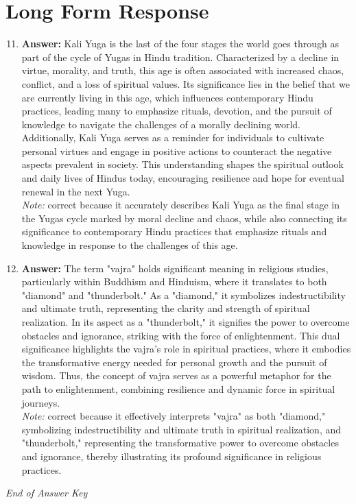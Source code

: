 \documentclass[12pt]{article}
\begin{document}
\section*{Long Form Response}
\begin{enumerate}[label=\arabic*.]
\setcounter{enumi}{10}
\item \textbf{Answer:} Kali Yuga is the last of the four stages the world goes through as part of the cycle of Yugas in Hindu tradition. Characterized by a decline in virtue, morality, and truth, this age is often associated with increased chaos, conflict, and a loss of spiritual values. Its significance lies in the belief that we are currently living in this age, which influences contemporary Hindu practices, leading many to emphasize rituals, devotion, and the pursuit of knowledge to navigate the challenges of a morally declining world. Additionally, Kali Yuga serves as a reminder for individuals to cultivate personal virtues and engage in positive actions to counteract the negative aspects prevalent in society. This understanding shapes the spiritual outlook and daily lives of Hindus today, encouraging resilience and hope for eventual renewal in the next Yuga.
\\ \textit{Note:} correct because it accurately describes Kali Yuga as the final stage in the Yugas cycle marked by moral decline and chaos, while also connecting its significance to contemporary Hindu practices that emphasize rituals and knowledge in response to the challenges of this age.
\item \textbf{Answer:} The term "vajra" holds significant meaning in religious studies, particularly within Buddhism and Hinduism, where it translates to both "diamond" and "thunderbolt." As a "diamond," it symbolizes indestructibility and ultimate truth, representing the clarity and strength of spiritual realization. In its aspect as a "thunderbolt," it signifies the power to overcome obstacles and ignorance, striking with the force of enlightenment. This dual significance highlights the vajra's role in spiritual practices, where it embodies the transformative energy needed for personal growth and the pursuit of wisdom. Thus, the concept of vajra serves as a powerful metaphor for the path to enlightenment, combining resilience and dynamic force in spiritual journeys.
\\ \textit{Note:} correct because it effectively interprets "vajra" as both "diamond," symbolizing indestructibility and ultimate truth in spiritual realization, and "thunderbolt," representing the transformative power to overcome obstacles and ignorance, thereby illustrating its profound significance in religious practices.
\end{enumerate}

\vfill
\noindent\textit{End of Answer Key}
\end{document}
